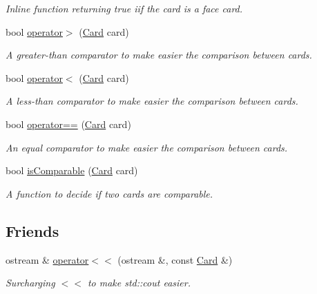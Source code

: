 \begin{DoxyCompactItemize}
\begin{DoxyCompactList}\small\item\em \-Inline function returning true iif the card is a face card. \end{DoxyCompactList}\item 
bool \hyperlink{classCard_aaba87fcffc3d8cb7aa1b143a849d2059}{operator$>$} (\hyperlink{classCard}{\-Card} card)
\begin{DoxyCompactList}\small\item\em \-A greater-\/than comparator to make easier the comparison between cards. \end{DoxyCompactList}\item 
bool \hyperlink{classCard_a6183667cf3621ce28c8b1102c398f665}{operator$<$} (\hyperlink{classCard}{\-Card} card)
\begin{DoxyCompactList}\small\item\em \-A less-\/than comparator to make easier the comparison between cards. \end{DoxyCompactList}\item 
bool \hyperlink{classCard_ac13638d979545e702ad4deb3906c42d4}{operator==} (\hyperlink{classCard}{\-Card} card)
\begin{DoxyCompactList}\small\item\em \-An equal comparator to make easier the comparison between cards. \end{DoxyCompactList}\item 
bool \hyperlink{classCard_a8e417f86a410132484af0764b6822d65}{is\-Comparable} (\hyperlink{classCard}{\-Card} card)
\begin{DoxyCompactList}\small\item\em \-A function to decide if two cards are comparable. \end{DoxyCompactList}\end{DoxyCompactItemize}
\subsection*{\-Friends}
\begin{DoxyCompactItemize}
\item 
\hypertarget{classCard_a19eb35e24a8f6368e34575698fca9008}{ostream \& \hyperlink{classCard_a19eb35e24a8f6368e34575698fca9008}{operator$<$$<$} (ostream \&, const \hyperlink{classCard}{\-Card} \&)}\label{classCard_a19eb35e24a8f6368e34575698fca9008}

\begin{DoxyCompactList}\small\item\em \-Surcharging $<$$<$ to make std\-::cout easier. \end{DoxyCompactList}\end{DoxyCompactItemize}


